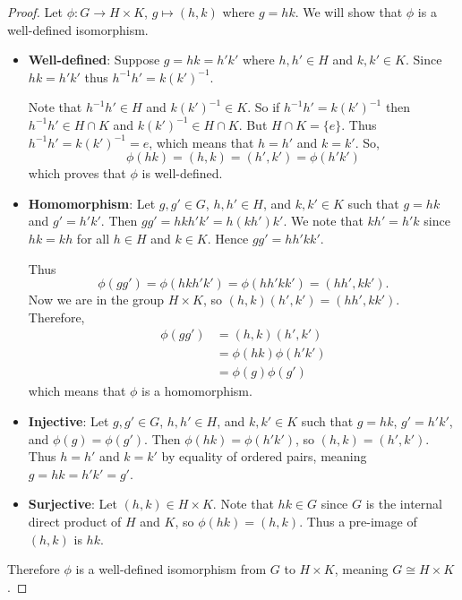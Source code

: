 \begin{proof}
    Let $\phi: G \to H \times K$, $g \mapsto (h, k)$ where $g = hk$. We will show that $\phi$ is a well-defined isomorphism.
    \begin{itemize}
        \item \textbf{Well-defined}: Suppose $g = hk = h'k'$ where $h, h' \in H$ and $k, k' \in K$. Since $hk = h'k'$ thus $h^{-1}h' = k(k')^{-1}$.

        Note that $h^{-1}h' \in H$ and $k(k')^{-1} \in K$. So if $h^{-1}h' = k(k')^{-1}$ then $h^{-1}h' \in H \cap K$ and $k(k')^{-1} \in H \cap K$. But $H \cap K = \{e\}$. Thus $h^{-1}h' = k(k')^{-1} = e$, which means that $h = h'$ and $k = k'$. So,
        \[
            \phi(hk) = (h, k) = (h', k') = \phi(h'k')
        \]
        which proves that $\phi$ is well-defined.

        \item \textbf{Homomorphism}: Let $g, g' \in G$, $h, h' \in H$, and $k, k' \in K$ such that $g = hk$ and $g' = h'k'$. Then $gg' = hkh'k' = h(kh')k'$. We note that $kh' = h'k$ since $hk = kh$ for all $h \in H$ and $k \in K$. Hence $gg' = hh'kk'$.

        Thus
        \[
            \phi(gg') = \phi(hkh'k') = \phi(hh'kk') = (hh', kk').
        \]
        Now we are in the group $H \times K$, so $(h, k)(h', k') = (hh', kk')$. Therefore,
        \begin{align*}
            \phi(gg') &= (h,k)(h',k')\\
            &= \phi(hk)\phi(h'k')\\
            &= \phi(g)\phi(g')
        \end{align*}
        which means that $\phi$ is a homomorphism.

        \item \textbf{Injective}: Let $g, g' \in G$, $h, h' \in H$, and $k, k' \in K$ such that $g = hk$, $g' = h'k'$, and $\phi(g) = \phi(g')$. Then $\phi(hk) = \phi(h'k')$, so $(h,k) = (h',k')$. Thus $h = h'$ and $k = k'$ by equality of ordered pairs, meaning $g = hk = h'k' = g'$.

        \item \textbf{Surjective}: Let $(h, k) \in H \times K$. Note that $hk \in G$ since $G$ is the internal direct product of $H$ and $K$, so $\phi(hk) = (h, k)$. Thus a pre-image of $(h, k)$ is $hk$.
    \end{itemize}
    Therefore $\phi$ is a well-defined isomorphism from $G$ to $H \times K$, meaning $G \cong H \times K$.
\end{proof}

